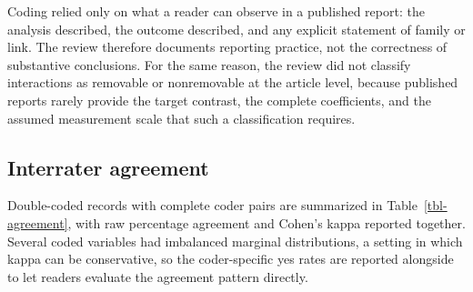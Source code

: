 \documentclass[
  man,
  floatsintext,
  longtable,
  nolmodern,
  notxfonts,
  notimes,
  colorlinks=true,linkcolor=blue,citecolor=blue,urlcolor=blue]{apa7}
\begin{document}
Coding relied only on what a reader can observe in a published report:
the analysis described, the outcome described, and any explicit
statement of family or link. The review therefore documents reporting
practice, not the correctness of substantive conclusions. For the same
reason, the review did not classify interactions as removable or
nonremovable at the article level, because published reports rarely
provide the target contrast, the complete coefficients, and the assumed
measurement scale that such a classification requires.

\subsection{Interrater agreement}\label{interrater-agreement}

Double-coded records with complete coder pairs are summarized in
Table~\ref{tbl-agreement}, with raw percentage agreement and Cohen's
kappa reported together. Several coded variables had imbalanced marginal
distributions, a setting in which kappa can be conservative, so the
coder-specific yes rates are reported alongside to let readers evaluate
the agreement pattern directly.
\end{document}
